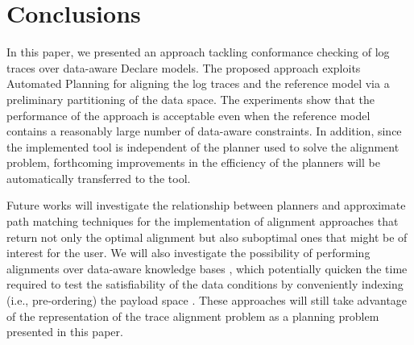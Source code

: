 \section{Conclusions}\label{sec:end}
In this paper, we presented an approach tackling conformance checking of log traces over data-aware Declare models. The proposed approach exploits Automated Planning for aligning the log traces and the reference model via a preliminary partitioning of the data space. The experiments show that the performance of the approach is acceptable even when the reference model contains a reasonably large number of data-aware constraints. In addition, since the implemented tool is independent of the planner used to solve the alignment problem, forthcoming improvements in the efficiency of the planners will be automatically transferred to the tool.

Future works will investigate the relationship between planners and approximate path matching techniques \cite{Myers1989} for the implementation of alignment approaches that return not only the optimal alignment but also suboptimal ones that might be of interest for the user. We will also investigate the possibility of performing alignments over data-aware knowledge bases \cite{10.1007/978-3-319-39696-5_18}, which potentially quicken the time required to test the satisfiability of the data conditions by conveniently indexing (i.e., pre-ordering) the payload space \cite{IdreosGNMMK12}. These approaches will still take advantage of the representation of the trace alignment problem as a planning problem presented in this paper. 